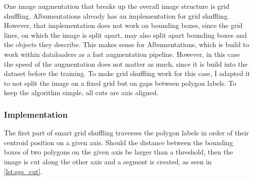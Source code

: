 \documentclass[10pt]{book}
\begin{document}
One image augmentation that breaks up the overall image structure is grid shuffling. Albumentations already has an implementation for grid shuffling. However, that implementation does not work on bounding boxes, since the grid lines, on which the image is split apart, may also split apart bounding boxes and the objects they describe. This makes sense for Albumentations, which is build to work within dataloaders as a fast augmentation pipeline. However, in this case the speed of the augmentation does not matter as much, since it is build into the dataset before the training. To make grid shuffling work for this case, I adapted it to not split the image on a fixed grid but on gaps between polygon labels. To keep the algorithm simple, all cuts are axis aligned.

\subsubsection{Implementation}

The first part of smart grid shuffling traverses the polygon labels in order of their centroid position on a given axis. Should the distance between the bounding boxes of two polygons on the given axis be larger than a threshold, then the image is cut along the other axis and a segment is created, as seen in \autoref{lst:sgs_cut}.







\end{document}
